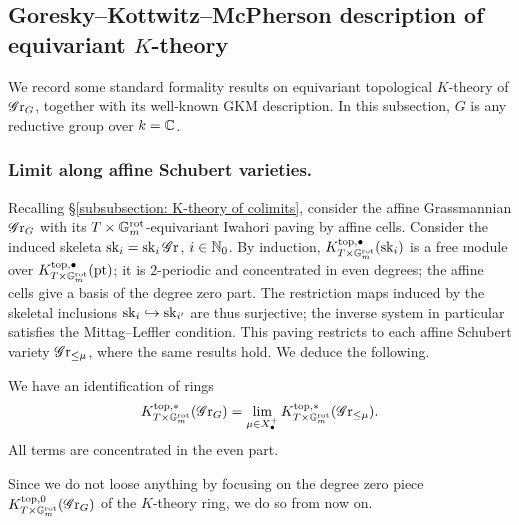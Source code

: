 \subsection{Goresky--Kottwitz--McPherson description of equivariant \texorpdfstring{$K$}{K}-theory} \label{section: Goresky--Kottwitz--McPherson description of equivariant $K$-theory}
We record some standard formality results on equivariant topological $K$-theory of $\operatorname{\mathscr{G}r}_G$, together with its well-known GKM description. In this subsection, $G$ is any reductive group over $k=\operatorname{\mathbb{C}}$.


\subsubsection{Limit along affine Schubert varieties.} Recalling \S \ref{subsubsection: K-theory of colimits}, consider the affine Grassmannian $\operatorname{\mathscr{G}r}_G$ with its $T\times \mathbb{G}_m^{\mathrm{rot}}$-equivariant Iwahori paving by affine cells. Consider the induced skeleta $\operatorname{sk}_i = \operatorname{sk}_i \operatorname{\mathscr{G}r}$, $i \in \operatorname{\mathbb{N}}_0$. By induction, $K^{\mathrm{top}, \bullet}_{T \times \mathbb{G}_m^{\mathrm{rot}}}(\operatorname{sk}_i)$ is a free module over $K^{\mathrm{top}, \bullet}_{T \times \mathbb{G}_m^{\mathrm{rot}}}(\operatorname{pt})$; it is $2$-periodic and concentrated in even degrees; the affine cells give a basis of the degree zero part. The restriction maps induced by the skeletal inclusions $\operatorname{sk}_i \hookrightarrow \operatorname{sk}_{i'}$ are thus surjective; the inverse system in particular satisfies the Mittag--Leffler condition. This paving restricts to each affine Schubert variety $\operatorname{\mathscr{G}r}_{\leq \mu}$, where the same results hold. We deduce the following.
\begin{proposition}\label{proposition: completion of K-theory}
We have an identification of rings
 \begin{equation*}
  K^{\mathrm{top}, *}_{T \times \mathbb{G}_m^{\mathrm{rot}}}(\operatorname{\mathscr{G}r}_G) = \operatorname*{lim}_{\mu \in X^+_{\bullet}} K^{\mathrm{top}, *}_{T \times \mathbb{G}_m^{\mathrm{rot}}}(\operatorname{\mathscr{G}r}_{\leq \mu}).   
\end{equation*} 
All terms are concentrated in the even part.
\end{proposition}
Since we do not loose anything by focusing on the degree zero piece $K^{\mathrm{top}, 0}_{T \times \mathbb{G}_m^{\mathrm{rot}}}(\operatorname{\mathscr{G}r}_G)$ of the $K$-theory ring, we do so from now on.


